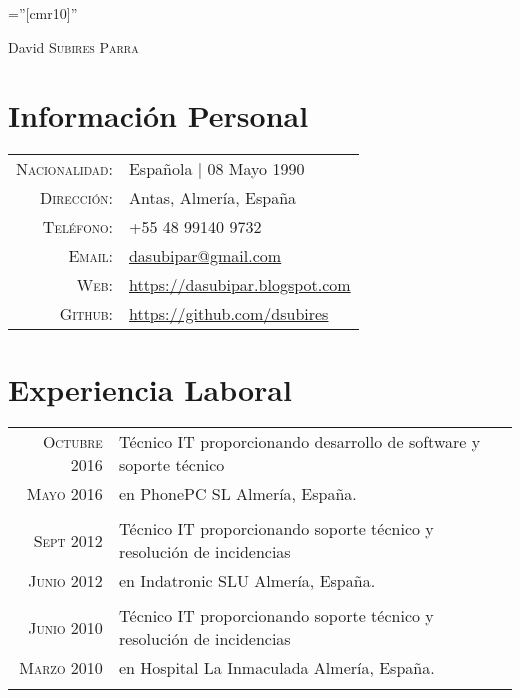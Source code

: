 \documentclass[a4paper,10pt]{article}
\begin{document}
\pagestyle{empty} %

\font\fb=''[cmr10]'' %

\par{\centering
		{\Huge David \textsc{Subires Parra}
	}\bigskip\par}

\section*{Información Personal}

\begin{tabular}{rp{12cm}}
    \textsc{Nacionalidad:} & Española | 08 Mayo 1990 \\
    \textsc{Dirección:}     & Antas, Almería, España \\
    \textsc{Teléfono:}       & +55 48 99140 9732 \\
    \textsc{Email:}       & \href {mailto:dasubipar@gmail.com}{dasubipar@gmail.com} \\
    \textsc{Web:}     & \url {https://dasubipar.blogspot.com} \\
    \textsc{Github:}      & \url{https://github.com/dsubires}
\end{tabular}

\section*{Experiencia Laboral}
\begin{tabular}{r|p{11cm}}

\textsc{Octubre} 2016 & Técnico IT proporcionando desarrollo de software y soporte técnico\\\textsc{Mayo 2016} & en PhonePC SL Almería, España. \normalsize \\\multicolumn{2}{c}{} \\

\textsc{Sept} 2012 & Técnico IT proporcionando soporte técnico y resolución de incidencias\\\textsc{Junio 2012} & en Indatronic SLU Almería, España. \normalsize \\\multicolumn{2}{c}{} \\

\textsc{Junio} 2010 & Técnico IT proporcionando soporte técnico y resolución de incidencias\\\textsc{Marzo 2010} & en Hospital La Inmaculada Almería, España. \normalsize \\\multicolumn{2}{c}{} \\


\end{tabular}
\end{document}
